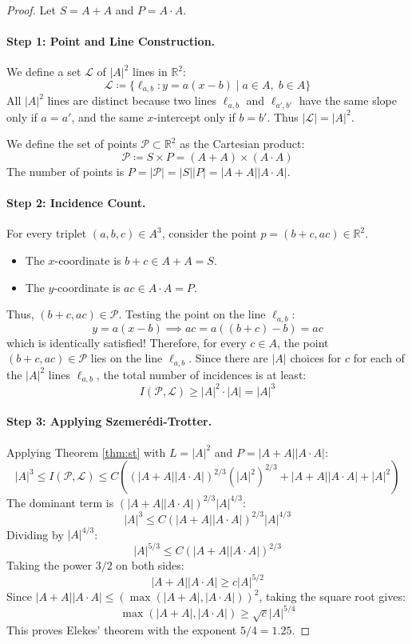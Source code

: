 \documentclass[11pt,a4paper]{article}
\theoremstyle{definition}
\begin{document}
\begin{proof}
Let $S = A + A$ and $P = A \cdot A$.
\paragraph{Step 1: Point and Line Construction.}
We define a set $\mathcal{L}$ of $|A|^2$ lines in $\mathbb{R}^2$:
\[ \mathcal{L} \coloneqq \{ \ell_{a, b} : y = a(x - b) \mid a \in A, \; b \in A \} \]
All $|A|^2$ lines are distinct because two lines $\ell_{a, b}$ and $\ell_{a', b'}$ have the same slope only if $a = a'$, and the same $x$-intercept only if $b = b'$. Thus $|\mathcal{L}| = |A|^2$.

We define the set of points $\mathcal{P} \subset \mathbb{R}^2$ as the Cartesian product:
\[ \mathcal{P} \coloneqq S \times P = (A + A) \times (A \cdot A) \]
The number of points is $P = |\mathcal{P}| = |S| |P| = |A + A| |A \cdot A|$.

\paragraph{Step 2: Incidence Count.}
For every triplet $(a, b, c) \in A^3$, consider the point $p = (b + c, ac) \in \mathbb{R}^2$.
\begin{itemize}
    \item The $x$-coordinate is $b + c \in A + A = S$.
    \item The $y$-coordinate is $ac \in A \cdot A = P$.
\end{itemize}
Thus, $(b + c, ac) \in \mathcal{P}$.
Testing the point on the line $\ell_{a, b}$:
\[ y = a(x - b) \implies ac = a((b + c) - b) = ac \]
which is identically satisfied!
Therefore, for every $c \in A$, the point $(b + c, ac) \in \mathcal{P}$ lies on the line $\ell_{a, b}$.
Since there are $|A|$ choices for $c$ for each of the $|A|^2$ lines $\ell_{a, b}$, the total number of incidences is at least:
\begin{equation}\label{eq:inc_lower}
I(\mathcal{P}, \mathcal{L}) \ge |A|^2 \cdot |A| = |A|^3
\end{equation}

\paragraph{Step 3: Applying Szemer\'edi-Trotter.}
Applying Theorem \ref{thm:st} with $L = |A|^2$ and $P = |A+A| |A \cdot A|$:
\[ |A|^3 \le I(\mathcal{P}, \mathcal{L}) \le C \left( (|A+A| |A \cdot A|)^{2/3} (|A|^2)^{2/3} + |A+A| |A \cdot A| + |A|^2 \right) \]
The dominant term is $(|A+A| |A \cdot A|)^{2/3} |A|^{4/3}$:
\[ |A|^3 \le C (|A+A| |A \cdot A|)^{2/3} |A|^{4/3} \]
Dividing by $|A|^{4/3}$:
\[ |A|^{5/3} \le C (|A+A| |A \cdot A|)^{2/3} \]
Taking the power $3/2$ on both sides:
\begin{equation}\label{eq:prod_bound}
|A+A| |A \cdot A| \ge c |A|^{5/2}
\end{equation}
Since $|A+A| |A \cdot A| \le (\max(|A+A|, |A \cdot A|))^2$, taking the square root gives:
\[ \max(|A+A|, |A \cdot A|) \ge \sqrt{c} |A|^{5/4} \]
This proves Elekes' theorem with the exponent $5/4 = 1.25$.
\end{proof}
\end{document}

